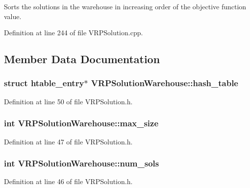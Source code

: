Sorts the solutions in the warehouse in increasing order of the objective function value.



Definition at line 244 of file VRPSolution.cpp.



\subsection{Member Data Documentation}
\hypertarget{class_v_r_p_solution_warehouse_a74c6f15c63291c409e6fc928c2e0e904}{
\subsubsection[{hash\_\-table}]{\setlength{\rightskip}{0pt plus 5cm}struct {\bf htable\_\-entry}$\ast$ {\bf VRPSolutionWarehouse::hash\_\-table}}}
\label{class_v_r_p_solution_warehouse_a74c6f15c63291c409e6fc928c2e0e904}


Definition at line 50 of file VRPSolution.h.

\hypertarget{class_v_r_p_solution_warehouse_a6d4e647d02412160016f2077cc797e70}{
\subsubsection[{max\_\-size}]{\setlength{\rightskip}{0pt plus 5cm}int {\bf VRPSolutionWarehouse::max\_\-size}}}
\label{class_v_r_p_solution_warehouse_a6d4e647d02412160016f2077cc797e70}


Definition at line 47 of file VRPSolution.h.

\hypertarget{class_v_r_p_solution_warehouse_a3272c6071c468bee74e5a1c00c7704fe}{
\subsubsection[{num\_\-sols}]{\setlength{\rightskip}{0pt plus 5cm}int {\bf VRPSolutionWarehouse::num\_\-sols}}}
\label{class_v_r_p_solution_warehouse_a3272c6071c468bee74e5a1c00c7704fe}


Definition at line 46 of file VRPSolution.h.

